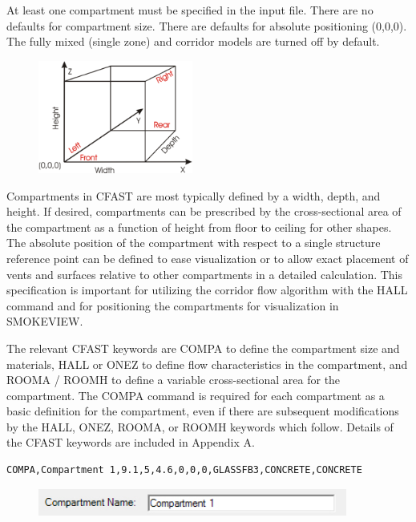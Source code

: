 At least one compartment must be specified in the input file.  There are no defaults for compartment size. There are defaults for absolute positioning (0,0,0). The fully mixed (single zone) and corridor models are turned off by default.

\begin{figure}
  \includegraphics[width=2.0in]{FIGURES/Input_File/CFAST_Coordinates}
\end{figure}

Compartments in CFAST are most typically defined by a width, depth, and height.  If desired, compartments can be prescribed by the cross-sectional area of the compartment as a function of height from floor to ceiling for other shapes. The absolute position of the compartment with respect to a single structure reference point can be defined to ease visualization or to allow exact placement of vents and surfaces relative to other compartments in a detailed calculation. This specification is important for utilizing the corridor flow algorithm with the HALL command and for positioning the compartments for visualization in SMOKEVIEW.

The relevant CFAST keywords are COMPA to define the compartment size and materials, HALL or ONEZ to define flow characteristics in the compartment, and ROOMA / ROOMH to define a variable cross-sectional area for the compartment. The COMPA command is required for each compartment as a basic definition for the compartment, even if there are subsequent modifications by the HALL, ONEZ, ROOMA, or ROOMH keywords which follow.  Details of the CFAST keywords are included in Appendix A.

\begin{lstlisting}
COMPA,Compartment 1,9.1,5,4.6,0,0,0,GLASSFB3,CONCRETE,CONCRETE
\end{lstlisting}

\begin{figure}[h!]
\begin{center}
\includegraphics[width=4.0in]{FIGURES/Input_File/Compartment_Name}
\end{center}
\end{figure}

